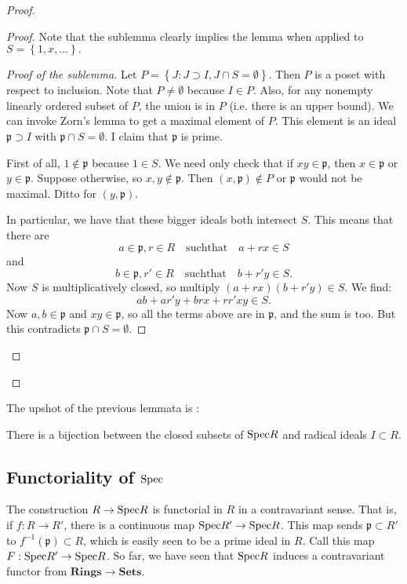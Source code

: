 \begin{proof}
\begin{proof}
Note that the sublemma clearly implies the lemma when applied to $S =
\left\{1, x, \dots\right\}.$

\begin{proof}[Proof of the sublemma]
Let $P = \left\{J: J \supset I, J \cap S = \emptyset \right\}$. Then $P$ is a
poset with respect to  inclusion. Note that $P \neq \emptyset$ because $I \in P$.  Also,
for any nonempty linearly ordered subset of $P$, the union is in $P$ (i.e. there is an
upper bound).  
We can invoke Zorn's lemma to get a maximal element of $P$.  This element is an
ideal $\mathfrak{p} \supset I$ with $\mathfrak{p} \cap S = \emptyset$.  I claim
that $\mathfrak{p}$ is prime.

First of all, $1 \notin \mathfrak{p}$ because $1 \in S$.  We need only check
that if $xy \in \mathfrak{p}$, then $x \in \mathfrak{p}$ or $y \in
\mathfrak{p}$. Suppose otherwise, so $x,y \notin \mathfrak{p}$.  Then $(x,\mathfrak{p}) \notin P$ or
$\mathfrak{p}$ would not be maximal. Ditto for $(y, \mathfrak{p})$. 

In particular, we have that these bigger ideals both intersect $S$.  This means
that there are 
\[  a \in \mathfrak{p} , r \in R \quad \mathrm{such that }\quad a+rx \in S \]
and 
\[  b \in \mathfrak{p} , r' \in R \quad \mathrm{such that}\quad b+r'y \in S .\]
Now $S$ is multiplicatively closed, so multiply $(a+rx)(b+r'y) \in S$.
We find:
\[ ab + ar'y+brx+rr'xy \in S.  \]
Now $a,b \in \mathfrak{p}$ and $xy \in \mathfrak{p}$, so all the terms above
are in $\mathfrak{p}$, and the sum is too. But this contradicts $\mathfrak{p}
\cap S = \emptyset$. 
\end{proof}
\end{proof} 
\end{proof} 

The upshot of the previous lemmata is :
\begin{proposition}
There is a bijection between the closed subsets of $\mathrm{Spec} R$ and radical ideals
$I \subset R$.
\end{proposition}

\subsection{Functoriality of $\mathrm{Spec}$}
 The construction $R \to \mathrm{Spec} R$ is functorial in $R$ in a
contravariant sense.   That is,  if $f: R \to R'$, there is a continuous map $\mathrm{Spec}
R' \to \mathrm{Spec} R$. This map sends $\mathfrak{p} \subset R'$ to
$f^{-1}(\mathfrak{p}) \subset R$, which is easily seen to be a prime ideal
in $R$.   Call this map $F: \mathrm{Spec} R' \to \mathrm{Spec} R$. So far, we have seen that
$\mathrm{Spec} R$ induces a contravariant  functor from $\mathbf{Rings} \to \mathbf{Sets}$.

